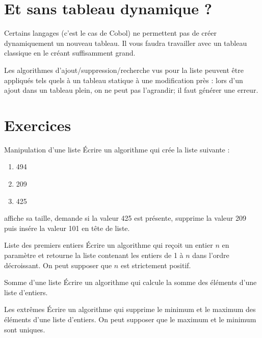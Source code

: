 	
	\section{Et sans tableau dynamique ?}
	
		Certains langages (c’est le cas de Cobol) ne permettent pas de créer
		dynamiquement un nouveau tableau. Il vous faudra travailler avec un
		tableau classique en le créant suffisamment grand.
			
		Les algorithmes d’ajout/suppression/recherche vus pour la liste peuvent
		être appliqués tels quels à un tableau statique à une modification près
		: lors d’un ajout dans un tableau plein, on ne peut pas l’agrandir; il
		faut générer une erreur.
	
	\section{Exercices}
	
		\begin{Exercice}{Manipulation d'une liste}
			Écrire un algorithme qui crée la liste suivante :
			\begin{enumerate}[start=0]
			\item 494
			\item 209
			\item 425
			\end{enumerate}
			affiche sa taille, demande si la valeur 425 est présente, 
			supprime la valeur 209 puis insére la valeur 101 en tête de liste.
		\end{Exercice}
		
		\begin{Exercice}{Liste des premiers entiers}
			Écrire un algorithme qui reçoit un entier $n$ en paramètre et retourne la
			liste contenant les entiers de 1 à $n$ dans l'ordre
			décroissant. On peut supposer que $n$ est strictement positif.
		\end{Exercice}
			
		\begin{Exercice}{Somme d'une liste}
			Écrire un algorithme qui calcule la somme des éléments d’une liste
			d’entiers.
		\end{Exercice}
		
		\begin{Exercice}{Les extrêmes}
				Écrire un algorithme qui supprime le minimum et le maximum des éléments
				d’une liste d’entiers. On peut supposer que le maximum et le minimum
				sont uniques.
		\end{Exercice}
		
